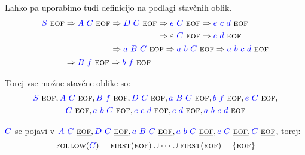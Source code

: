 \documentclass{article}
\newcommand{\FIRST}{\textsc{first}}
\newcommand{\FOLLOW}{\textsc{follow}}
\newcommand{\EOF}{\textsc{eof}}
\newcommand{\Symbol}[1]{\textcolor{blue}{#1}}
\newcommand{\Null}{\varepsilon}
\newcommand{\Derive}{\Rightarrow}
\newcommand{\Seq}{\ }
\begin{document}
Lahko pa uporabimo tudi definicijo na podlagi stavčnih oblik.
\begin{equation*}
  \Symbol{S} \Seq \EOF \begin{aligned}[t]
    &\Derive \Symbol{A} \Seq \Symbol{C} \Seq \EOF \begin{aligned}[t]
      &\Derive \Symbol{D} \Seq \Symbol{C} \Seq \EOF \begin{aligned}[t]
        &\Derive \Symbol{e} \Seq \Symbol{C} \Seq \EOF \Derive \Symbol{e} \Seq \Symbol{c} \Seq \Symbol{d} \Seq \EOF \\
        &\Derive \Null \Seq \Symbol{C} \Seq \EOF \Derive \Symbol{c} \Seq \Symbol{d} \Seq \EOF \\
      \end{aligned}\\
      &\Derive \Symbol{a} \Seq \Symbol{B} \Seq \Symbol{C} \Seq \EOF \Derive \Symbol{a} \Seq \Symbol{b} \Seq \Symbol{C} \Seq \EOF \Derive \Symbol{a} \Seq \Symbol{b} \Seq \Symbol{c} \Seq \Symbol{d} \Seq \EOF
    \end{aligned}\\
    &\Derive \Symbol{B} \Seq \Symbol{f} \Seq \EOF \Derive \Symbol{b} \Seq \Symbol{f} \Seq \EOF
  \end{aligned}
\end{equation*}

Torej vse možne stavčne oblike so:
\begin{multline*}
  \Symbol{S} \Seq \EOF, \Symbol{A} \Seq \Symbol{C} \Seq \EOF, \Symbol{B} \Seq \Symbol{f} \Seq \EOF, \Symbol{D} \Seq \Symbol{C} \Seq \EOF, \Symbol{a} \Seq \Symbol{B} \Seq \Symbol{C} \Seq \EOF, \Symbol{b} \Seq \Symbol{f} \Seq \EOF, \Symbol{e} \Seq \Symbol{C} \Seq \EOF,\\ \Symbol{C} \Seq \EOF, \Symbol{a} \Seq \Symbol{b} \Seq \Symbol{C} \Seq \EOF, \Symbol{e} \Seq \Symbol{c} \Seq \Symbol{d} \Seq \EOF, \Symbol{c} \Seq \Symbol{d} \Seq \EOF, \Symbol{a} \Seq \Symbol{b} \Seq \Symbol{c} \Seq \Symbol{d} \Seq \EOF
\end{multline*}

$\Symbol{C}$ se pojavi v $\Symbol{A} \Seq \Symbol{C} \Seq \underline{\EOF}, \Symbol{D} \Seq \Symbol{C} \Seq \underline{\EOF}, \Symbol{a} \Seq \Symbol{B} \Seq \Symbol{C} \Seq \underline{\EOF}, \Symbol{a} \Seq \Symbol{b} \Seq \Symbol{C} \Seq \underline{\EOF}, \Symbol{e} \Seq \Symbol{C} \Seq \underline{\EOF}, \Symbol{C} \Seq \underline{\EOF}$, torej:
\begin{equation*}
  \FOLLOW(\Symbol{C}) = \FIRST(\EOF) \cup \dots \cup \FIRST(\EOF) = \{\EOF\}
\end{equation*}
\end{document}
